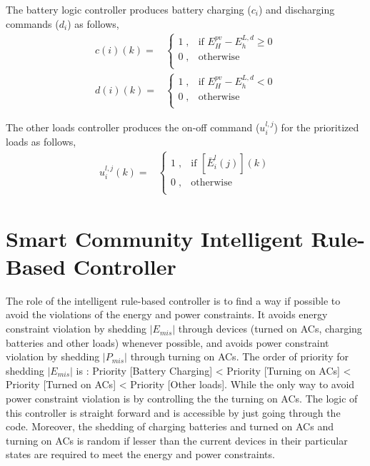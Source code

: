 \documentclass[11pt,usenames]{article}
\begin{document}
The battery logic controller produces battery charging ($c_{i}$) and discharging commands ($d_{i}$) as follows,
\begin{align}
	c(i)(k)= & 
	\begin{cases}
		1 \; , & \text{if } E_{H}^{pv}-E_{h}^{L,d}\geq0 \\
		0 \; , & \text{otherwise} \\
	\end{cases}\\
	d(i)(k)= & 
	\begin{cases}
		1 \; , & \text{if } E_{H}^{pv}-E_{h}^{L,d}<0 \\
		0 \; , & \text{otherwise} \\
	\end{cases}
\end{align}

The other loads controller produces the on-off command ($u_{i}^{l,j}$) for the prioritized loads as follows,
\begin{align}
	u_{i}^{l,j}(k)= & 
	\begin{cases}
		1 \; , & \text{if }  \left[ \bar E_{i}^{l}(j)\right] (k) \\
		0 \; , & \text{otherwise} \\
	\end{cases}
\end{align}
\newpage

\section{Smart Community Intelligent Rule-Based Controller}\label{section:RuleBasedController}
The role of the intelligent rule-based controller is to find a way if possible to avoid the violations of the energy and power constraints. It avoids energy constraint violation by shedding $|E_{mis}|$ through devices (turned on ACs, charging batteries and other loads) whenever possible, and avoids power constraint violation by shedding $|P_{mis}|$ through turning on ACs. The order of priority for shedding $|E_{mis}|$ is : Priority [Battery Charging] < Priority [Turning on ACs] < Priority [Turned on ACs] < Priority [Other loads]. While the only way to avoid power constraint violation is by controlling the the turning on ACs. The logic of this controller is straight forward and is accessible by just going through the code. Moreover, the shedding of charging batteries and turned on ACs and turning on ACs is random if lesser than the current devices in their particular states are required to meet the energy and power constraints.
\end{document}
